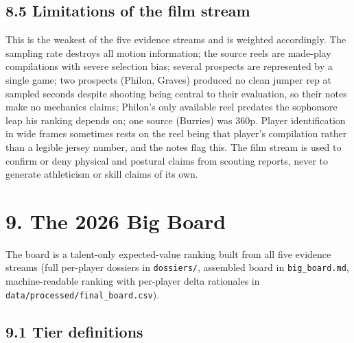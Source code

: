 \documentclass[
  10pt,
]{article}
\begin{document}
\subsection{8.5 Limitations of the film
stream}\label{limitations-of-the-film-stream}

This is the weakest of the five evidence streams and is weighted accordingly.
The sampling rate destroys all motion information; the source reels are
made-play compilations with severe selection bias; several prospects are
represented by a single game; two prospects (Philon, Graves) produced no clean
jumper rep at sampled seconds despite shooting being central to their
evaluation, so their notes make no mechanics claims; Philon's only available
reel predates the sophomore leap his ranking depends on; one source (Burries)
was 360p. Player identification in wide frames sometimes rests on the reel being
that player's compilation rather than a legible jersey number, and the notes
flag this. The film stream is used to confirm or deny physical and postural
claims from scouting reports, never to generate athleticism or skill claims of
its own.

\section{9. The 2026 Big Board}\label{the-2026-big-board}

The board is a talent-only expected-value ranking built from all five evidence
streams (full per-player dossiers in \texttt{dossiers/}, assembled board in
\texttt{big\_board.md}, machine-readable ranking with per-player delta
rationales in \texttt{data/processed/final\_board.csv}).

\subsection{9.1 Tier definitions}\label{tier-definitions}
\end{document}
